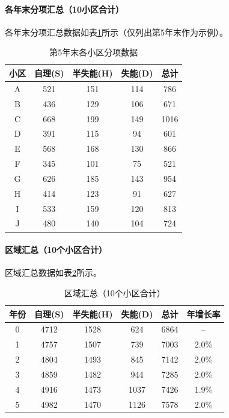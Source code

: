 \documentclass[UTF8]{ctexart}
\begin{document}
\paragraph{各年末分项汇总（10小区合计）}
各年末分项汇总数据如表\ref{tab:year_summary}所示（仅列出第5年末作为示例）。

\begin{table}[H]
\centering
\caption{第5年末各小区分项数据}
\label{tab:year_summary}
\renewcommand{\arraystretch}{1.3}
\begin{tabular}{|c|c|c|c|c|}
\hline
\textbf{小区} & \textbf{自理(S)} & \textbf{半失能(H)} & \textbf{失能(D)} & \textbf{总计} \\
\hline
A & 521 & 151 & 114 & 786 \\
\hline
B & 436 & 129 & 106 & 671 \\
\hline
C & 668 & 199 & 149 & 1016 \\
\hline
D & 391 & 115 & 94 & 601 \\
\hline
E & 568 & 168 & 130 & 866 \\
\hline
F & 345 & 101 & 75 & 521 \\
\hline
G & 626 & 185 & 143 & 954 \\
\hline
H & 414 & 123 & 91 & 627 \\
\hline
I & 533 & 159 & 120 & 813 \\
\hline
J & 480 & 140 & 104 & 724 \\
\hline
\end{tabular}
\end{table}

\paragraph{区域汇总（10个小区合计）}
区域汇总数据如表\ref{tab:region_summary}所示。

\begin{table}[H]
\centering
\caption{区域汇总（10个小区合计）}
\label{tab:region_summary}
\renewcommand{\arraystretch}{1.3}
\begin{tabular}{|c|c|c|c|c|c|}
\hline
\textbf{年份} & \textbf{自理(S)} & \textbf{半失能(H)} & \textbf{失能(D)} & \textbf{总计} & \textbf{年增长率} \\
\hline
0 & 4712 & 1528 & 624 & 6864 & -- \\
\hline
1 & 4757 & 1507 & 739 & 7003 & 2.0\% \\
\hline
2 & 4804 & 1493 & 845 & 7142 & 2.0\% \\
\hline
3 & 4859 & 1482 & 944 & 7285 & 2.0\% \\
\hline
4 & 4916 & 1473 & 1037 & 7426 & 1.9\% \\
\hline
5 & 4982 & 1470 & 1126 & 7578 & 2.0\% \\
\hline
\end{tabular}
\end{table}
\end{document}
